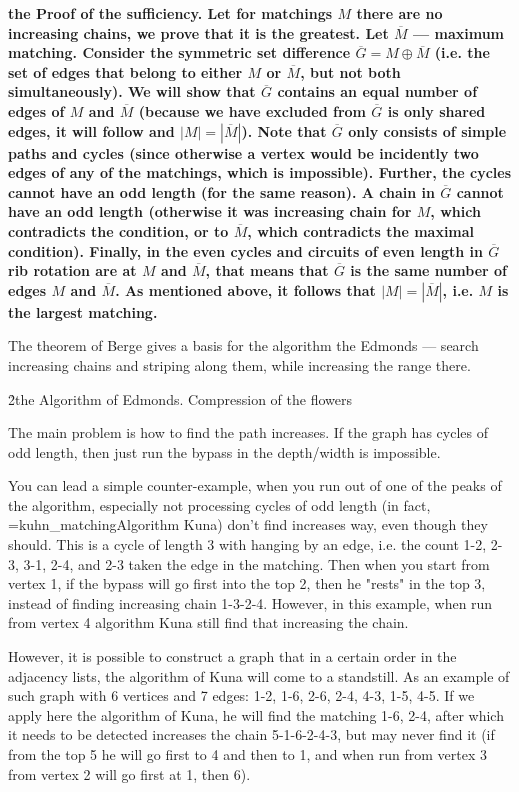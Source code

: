 \bf{the Proof of the sufficiency}. Let for matchings $M$ there are no increasing chains, we prove that it is the greatest. Let $\overline M$ --- maximum matching. Consider the symmetric set difference $\overline G = M \oplus \overline M$ (i.e. the set of edges that belong to either $M$ or $\overline M$, but not both simultaneously). We will show that $\overline G$ contains an equal number of edges of $M$ and $\overline M$ (because we have excluded from $\overline G$ is only shared edges, it will follow and $|M| = |\overline M|$). Note that $\overline G$ only consists of simple paths and cycles (since otherwise a vertex would be incidently two edges of any of the matchings, which is impossible). Further, the cycles cannot have an odd length (for the same reason). A chain in $\overline G$ cannot have an odd length (otherwise it was increasing chain for $M$, which contradicts the condition, or to $\overline M$, which contradicts the maximal condition). Finally, in the even cycles and circuits of even length in $\overline G$ rib rotation are at $M$ and $\overline M$, that means that $\overline G$ is the same number of edges $M$ and $\overline M$. As mentioned above, it follows that $|M| = |\overline M|$, i.e. $M$ is the largest matching.

The theorem of Berge gives a basis for the algorithm the Edmonds --- search increasing chains and striping along them, while increasing the range there.


\h2{the Algorithm of Edmonds. Compression of the flowers}

The main problem is how to find the path increases. If the graph has cycles of odd length, then just run the bypass in the depth/width is impossible.

You can lead a simple counter-example, when you run out of one of the peaks of the algorithm, especially not processing cycles of odd length (in fact, \algohref=kuhn_matching{Algorithm Kuna}) don't find increases way, even though they should. This is a cycle of length 3 with hanging by an edge, i.e. the count 1-2, 2-3, 3-1, 2-4, and 2-3 taken the edge in the matching. Then when you start from vertex 1, if the bypass will go first into the top 2, then he "rests" in the top 3, instead of finding increasing chain 1-3-2-4. However, in this example, when run from vertex 4 algorithm Kuna still find that increasing the chain.


However, it is possible to construct a graph that in a certain order in the adjacency lists, the algorithm of Kuna will come to a standstill. As an example of such graph with 6 vertices and 7 edges: 1-2, 1-6, 2-6, 2-4, 4-3, 1-5, 4-5. If we apply here the algorithm of Kuna, he will find the matching 1-6, 2-4, after which it needs to be detected increases the chain 5-1-6-2-4-3, but may never find it (if from the top 5 he will go first to 4 and then to 1, and when run from vertex 3 from vertex 2 will go first at 1, then 6).

